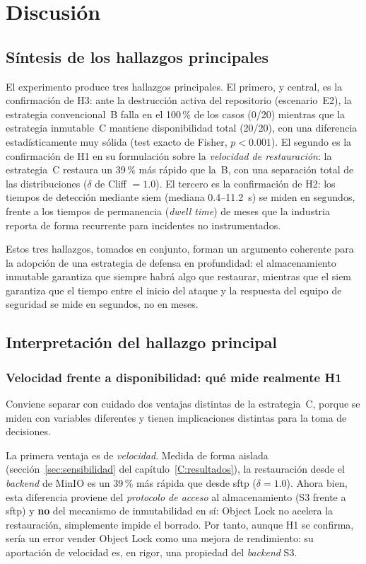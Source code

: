 \documentclass[../main.tex]{subfiles}
\begin{document}
\chapter{Discusión}
\label{C:discusion}

\section{Síntesis de los hallazgos principales}
\label{sec:sintesis-hallazgos}

El experimento produce tres hallazgos principales. El primero, y central, es la
confirmación de H3: ante la destrucción activa del repositorio (escenario~E2), la
estrategia convencional~B falla en el 100\,\% de los casos (0/20) mientras que la
estrategia inmutable~C mantiene disponibilidad total (20/20), con una diferencia
estadísticamente muy sólida (test exacto de Fisher, $p < 0.001$). El segundo es la
confirmación de H1 en su formulación sobre la \emph{velocidad de restauración}: la
estrategia~C restaura un 39\,\% más rápido que la~B, con una separación total de
las distribuciones ($\delta$ de Cliff $= 1.0$). El tercero es la confirmación de H2:
los tiempos de detección mediante \gls{siem} (mediana 0.4--11.2~s) se miden en
segundos, frente a los tiempos de permanencia (\emph{dwell time}) de meses que la
industria reporta de forma recurrente para incidentes no instrumentados.

Estos tres hallazgos, tomados en conjunto, forman un argumento coherente para la
adopción de una estrategia de defensa en profundidad: el almacenamiento inmutable
garantiza que siempre habrá algo que restaurar, mientras que el \gls{siem}
garantiza que el tiempo entre el inicio del ataque y la respuesta del equipo de
seguridad se mide en segundos, no en meses.

\section{Interpretación del hallazgo principal}

\subsection{Velocidad frente a disponibilidad: qué mide realmente H1}

Conviene separar con cuidado dos ventajas distintas de la estrategia~C, porque se
miden con variables diferentes y tienen implicaciones distintas para la toma de
decisiones.

La primera ventaja es de \emph{velocidad}. Medida de forma aislada
(sección~\ref{sec:sensibilidad} del capítulo~\ref{C:resultados}), la restauración
desde el \emph{backend} de MinIO es un 39\,\% más rápida que desde \gls{sftp}
($\delta = 1.0$). Ahora bien, esta diferencia proviene del \emph{protocolo de
acceso} al almacenamiento (S3 frente a \gls{sftp}) y \textbf{no} del mecanismo
de inmutabilidad en sí: Object Lock no acelera la restauración, simplemente impide
el borrado. Por tanto, aunque H1 se confirma, sería un error vender Object Lock
como una mejora de rendimiento: su aportación de velocidad es, en rigor, una
propiedad del \emph{backend} S3.
\end{document}

